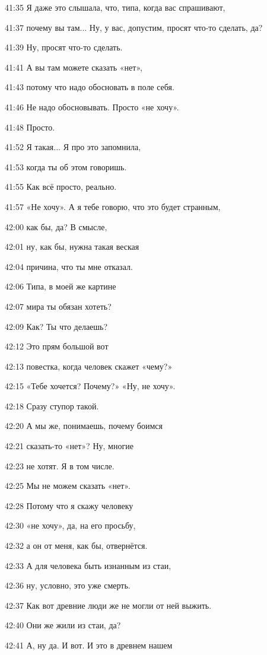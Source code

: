 41:35
Я даже это слышала, что, типа, когда вас спрашивают,

41:37
почему вы там... Ну, у вас, допустим, просят что-то сделать, да?

41:39
Ну, просят что-то сделать.

41:41
А вы там можете сказать «нет»,

41:43
потому что надо обосновать в поле себя.

41:46
Не надо обосновывать. Просто «не хочу».

41:48
Просто.

41:52
Я такая... Я про это запомнила,

41:53
когда ты об этом говоришь.

41:55
Как всё просто, реально.

41:57
«Не хочу». А я тебе говорю, что это будет странным,

42:00
как бы, да? В смысле,

42:01
ну, как бы, нужна такая веская

42:04
причина, что ты мне отказал.

42:06
Типа, в моей же картине

42:07
мира ты обязан хотеть?

42:09
Как? Ты что делаешь?

42:12
Это прям большой вот

42:13
повестка, когда человек скажет «чему?»

42:15
«Тебе хочется? Почему?» «Ну, не хочу».

42:18
Сразу ступор такой.

42:20
А мы же, понимаешь, почему боимся

42:21
сказать-то «нет»? Ну, многие

42:23
не хотят. Я в том числе.

42:25
Мы не можем сказать «нет».

42:28
Потому что я скажу человеку

42:30
«не хочу», да, на его просьбу,

42:32
а он от меня, как бы, отвернётся.

42:33
А для человека быть изнанным из стаи,

42:36
ну, условно, это уже смерть.

42:37
Как вот древние люди же не могли от ней выжить.

42:40
Они же жили из стаи, да?

42:41
А, ну да. И вот. И это в древнем нашем

